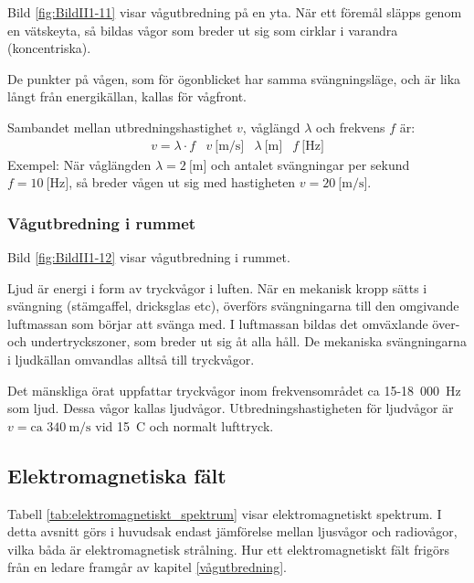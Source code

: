 Bild \ref{fig:BildII1-11} visar vågutbredning på en yta.
När ett föremål släpps genom en vätskeyta, så bildas vågor som breder ut sig
som cirklar i varandra (koncentriska).

De punkter på vågen, som för ögonblicket har samma svängningsläge, och är lika
långt från energikällan, kallas för vågfront.

Sambandet mellan utbredningshastighet \(v\), våglängd \(\lambda\) och frekvens
\(f\) är:
\[
\begin{array}{llll}
v = \lambda \cdot f & v \ \text{[m/s]} & \lambda \ \text{[m]} & f \ \text{[Hz]}
\end{array}
\]
Exempel: När våglängden \(\lambda = 2\ \text{[m]}\) och antalet svängningar per sekund
\(f = 10\ \text{[Hz]}\), så breder vågen ut sig med hastigheten \(v = 20\ \text{[m/s]}\).


\subsubsection{Vågutbredning i rummet}

Bild \ref{fig:BildII1-12} visar vågutbredning i rummet.

Ljud är energi i form av tryckvågor i luften.
När en mekanisk kropp sätts i svängning (stämgaffel, dricksglas etc), överförs
svängningarna till den omgivande luftmassan som börjar att svänga med.
I luftmassan bildas det omväxlande över- och undertryckszoner, som breder ut
sig åt alla håll.
De mekaniska svängningarna i ljudkällan omvandlas alltså till tryckvågor.

Det mänskliga örat uppfattar tryckvågor inom frekvensområdet ca
15-18~000~Hz som ljud.
Dessa vågor kallas ljudvågor.
Utbredningshastigheten för ljudvågor är \(v = \text{ca } 340\ \text{m/s}\) vid
15~\degree C och normalt lufttryck.

\subsection{Elektromagnetiska fält}

Tabell \ref{tab:elektromagnetiskt_spektrum} visar elektromagnetiskt spektrum.
I detta avsnitt görs i huvudsak endast jämförelse mellan ljusvågor och
radiovågor, vilka båda är elektromagnetisk strålning.
Hur ett elektromagnetiskt fält frigörs från en ledare framgår av kapitel
\ref{vågutbredning}.

